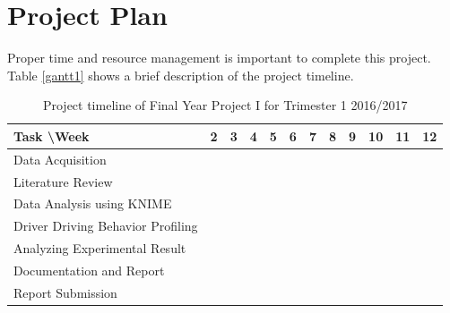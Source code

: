 \section{Project Plan}
Proper time and resource management is important to complete this project. Table \ref{gantt1} shows a brief description of the project timeline.

\begin{table}[h!]
\begin{tabular}{|l|c|c|c|c|c|c|c|c|c|c|c|}
\hline
Task \textbackslash Week & 2 & 3 & 4 & 5 & 6 & 7 & 8 & 9 & 10 & 11 & 12 \\

\hline
Data Acquisition &  \cellcolor[HTML]{000000} & \cellcolor[HTML]{000000} & \cellcolor[HTML]{000000} & \cellcolor[HTML]{000000} & \cellcolor[HTML]{000000} & & & & & & \\

\hline
Literature Review & & \cellcolor[HTML]{000000} & \cellcolor[HTML]{000000} & \cellcolor[HTML]{000000} & \cellcolor[HTML]{000000} & & & & & & \\

\hline
Data Analysis using KNIME & & & & & & \cellcolor[HTML]{000000} & \cellcolor[HTML]{000000} & \cellcolor[HTML]{000000} & & & \\

\hline
Driver Driving Behavior Profiling & & & & & & & & \cellcolor[HTML]{000000} & \cellcolor[HTML]{000000} &  & \\

\hline
Analyzing Experimental Result & & & & & & & & & \cellcolor[HTML]{000000} & \cellcolor[HTML]{000000} & \\

\hline
Documentation and Report & & & & & & & & & \cellcolor[HTML]{000000} & \cellcolor[HTML]{000000} & \cellcolor[HTML]{000000} \\

\hline
Report Submission & & & & & & & & & & & \cellcolor[HTML]{000000}\\

\hline
\end{tabular}
\label{tbl:gantt1}
\caption{Project timeline of Final Year Project I for Trimester 1 2016/2017}
\end{table}